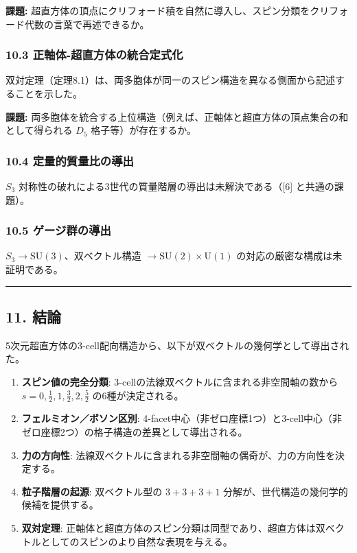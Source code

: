 \documentclass[a4paper,11pt]{ltjsarticle}
\providecommand{\tightlist}{\setlength{\itemsep}{0pt}\setlength{\parskip}{0pt}}
\begin{document}
\textbf{課題:} 超直方体の頂点にクリフォード積を自然に導入し、スピン分類をクリフォード代数の言葉で再述できるか。

\subsubsection*{10.3 正軸体-超直方体の統合定式化}

双対定理（定理8.1）は、両多胞体が同一のスピン構造を異なる側面から記述することを示した。

\textbf{課題:} 両多胞体を統合する上位構造（例えば、正軸体と超直方体の頂点集合の和として得られる $D_5$ 格子等）が存在するか。

\subsubsection*{10.4 定量的質量比の導出}

$S_3$ 対称性の破れによる3世代の質量階層の導出は未解決である（[6] と共通の課題）。

\subsubsection*{10.5 ゲージ群の導出}

$S_3 \to \mathrm{SU}(3)$、双ベクトル構造 $\to \mathrm{SU}(2) \times \mathrm{U}(1)$ の対応の厳密な構成は未証明である。

\begin{center}\rule{0.5\linewidth}{0.5pt}\end{center}

\subsection*{11. 結論}

5次元超直方体の3-cell配向構造から、以下が双ベクトルの幾何学として導出された。

\begin{enumerate}
\def\labelenumi{\arabic{enumi}.}
\tightlist
\item
  \textbf{スピン値の完全分類}: 3-cellの法線双ベクトルに含まれる非空間軸の数から
  $s = 0, \frac{1}{2}, 1, \frac{3}{2}, 2, \frac{5}{2}$
  の6種が決定される。
\item
  \textbf{フェルミオン／ボソン区別}:
  4-facet中心（非ゼロ座標1つ）と3-cell中心（非ゼロ座標2つ）の格子構造の差異として導出される。
\item
  \textbf{力の方向性}:
  法線双ベクトルに含まれる非空間軸の偶奇が、力の方向性を決定する。
\item
  \textbf{粒子階層の起源}: 双ベクトル型の $3 + 3 + 3 + 1$
  分解が、世代構造の幾何学的候補を提供する。
\item
  \textbf{双対定理}:
  正軸体と超直方体のスピン分類は同型であり、超直方体は双ベクトルとしてのスピンのより自然な表現を与える。
\end{enumerate}
\end{document}
